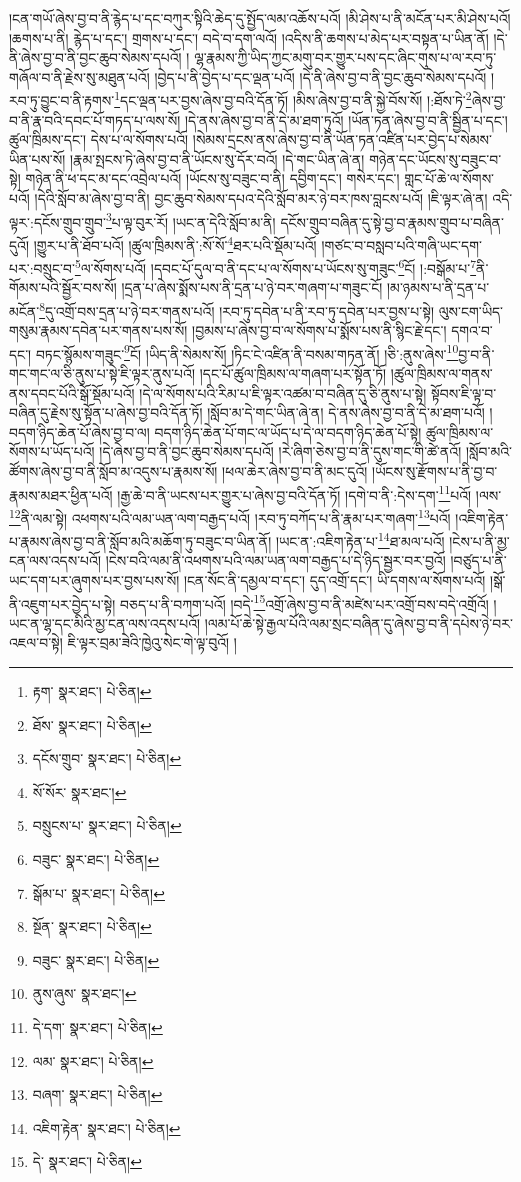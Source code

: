 །ངན་གཡོ་ཞེས་བྱ་བ་ནི་རྙེད་པ་དང་བཀུར་སྟིའི་ཆེད་དུ་སྤྱོད་ལམ་འཆོས་པའོ། །མི་ཤེས་པ་ནི་མངོན་པར་མི་ཤེས་པའོ། །ཆགས་པ་ནི། རྙེད་པ་དང་། གྲགས་པ་དང་། བདེ་བ་དག་ལའོ། །འདིས་ནི་ཆགས་པ་མེད་པར་བསྟན་པ་ཡིན་ནོ། །དེ་ནི་ཞེས་བྱ་བ་ནི་བྱང་ཆུབ་སེམས་དཔའོ། །
ལྷ་རྣམས་ཀྱི་ཡིད་ཀྱང་མགུ་བར་གྱུར་པས་དང་ཞིང་གུས་པ་ལ་རབ་ཏུ་གཞོལ་བ་ནི་རྗེས་སུ་མཐུན་པའོ། །བྱེད་པ་ནི་བྱེད་པ་དང་ལྡན་པའོ། །དེ་ནི་ཞེས་བྱ་བ་ནི་བྱང་ཆུབ་སེམས་དཔའོ། །རབ་ཏུ་བྱུང་བ་ནི་རྟགས་\footnote{རྟག་  སྣར་ཐང་།  པེ་ཅིན། }དང་ལྡན་པར་བྱས་ཞེས་བྱ་བའི་དོན་ཏོ། །མིས་ཞེས་བྱ་བ་ནི་སྐྱེ་བོས་སོ། །:ཐོས་ཏེ་\footnote{ཐོས་  སྣར་ཐང་།  པེ་ཅིན། }ཞེས་བྱ་བ་ནི་རྣ་བའི་དབང་པོ་གཏད་པ་ལས་སོ། །དེ་ནས་ཞེས་བྱ་བ་ནི་དེ་མ་ཐག་ཏུའོ། །ཡོན་ཏན་ཞེས་བྱ་བ་ནི་སྦྱིན་པ་དང་། ཚུལ་ཁྲིམས་དང་། དེས་པ་ལ་སོགས་པའོ། །སེམས་དྲངས་ནས་ཞེས་བྱ་བ་ནི་ཡོན་ཏན་འཛིན་པར་བྱེད་པ་སེམས་ཡིན་པས་སོ། །རྣམ་སྤངས་ཏེ་ཞེས་བྱ་བ་ནི་ཡོངས་སུ་དོར་བའོ། །དེ་གང་ཡིན་ཞེ་ན། གཉེན་དང་ཡོངས་སུ་བཟུང་བ་སྟེ། གཉེན་ནི་ཕ་དང་མ་དང་འབྲེལ་པའོ། །ཡོངས་སུ་བཟུང་བ་ནི། དབྱིག་དང་། གསེར་དང་། གླང་པོ་ཆེ་ལ་སོགས་པའོ། །དེའི་སློབ་མ་ཞེས་བྱ་བ་ནི། བྱང་ཆུབ་སེམས་དཔའ་དེའི་སློབ་མར་ཉེ་བར་ཁས་བླངས་པའོ། །ཇི་ལྟར་ཞེ་ན། འདི་ལྟར་:དངོས་གྲུབ་གྲུབ་\footnote{དངོས་གྲུབ་  སྣར་ཐང་།  པེ་ཅིན། }པ་ལྟ་བུར་རོ། །ཡང་ན་དེའི་སློབ་མ་ནི། དངོས་གྲུབ་བཞིན་དུ་སྟེ་བྱ་བ་རྣམས་གྲུབ་པ་བཞིན་དུའོ། །གྱུར་པ་ནི་ཐོབ་པའོ། །ཚུལ་ཁྲིམས་ནི་:སོ་སོ་\footnote{སོ་སོར་  སྣར་ཐང་། }ཐར་པའི་སྡོམ་པའོ། །གཙང་བ་བསླབ་པའི་གཞི་ཡང་དག་པར་:བསྲུང་བ་\footnote{བསྲུངས་པ་  སྣར་ཐང་།  པེ་ཅིན། }ལ་སོགས་པའོ། །དབང་པོ་དུལ་བ་ནི་དང་པ་ལ་སོགས་པ་ཡོངས་སུ་གཟུང་\footnote{བཟུང་  སྣར་ཐང་།  པེ་ཅིན། }ངོ། །:བསྒོམ་པ་\footnote{སྒོམ་པ་  སྣར་ཐང་།  པེ་ཅིན། }ནི་གོམས་པའི་སྦྱོར་བས་སོ། །དྲན་པ་ཞེས་སྨོས་པས་ནི་དྲན་པ་ཉེ་བར་གཞག་པ་གཟུང་ངོ། །མ་ཉམས་པ་ནི་དྲན་པ་མངོན་\footnote{སྔོན་  སྣར་ཐང་།  པེ་ཅིན། }དུ་འགྲོ་བས་དྲན་པ་ཉེ་བར་གནས་པའོ། །རབ་ཏུ་དབེན་པ་ནི་རབ་ཏུ་དབེན་པར་བྱས་པ་སྟེ། ལུས་ངག་ཡིད་གསུམ་རྣམས་དབེན་པར་གནས་པས་སོ། །བྱམས་པ་ཞེས་བྱ་བ་ལ་སོགས་པ་སྨོས་པས་ནི་སྙིང་རྗེ་དང་། དགའ་བ་དང་། བཏང་སྙོམས་གཟུང་\footnote{བཟུང་  སྣར་ཐང་།  པེ་ཅིན། }ངོ། །ཡིད་ནི་སེམས་སོ། །ཏིང་ངེ་འཛིན་ནི་བསམ་གཏན་ནོ། །ཅི་:ནུས་ཞེས་\footnote{ནུས་ཞུས་  སྣར་ཐང་། }བྱ་བ་ནི་གང་གང་ལ་ཅི་ནུས་པ་སྟེ་ཇི་ལྟར་ནུས་པའོ། །དང་པོ་ཚུལ་ཁྲིམས་ལ་གཞག་པར་སྟོན་ཏོ། །ཚུལ་ཁྲིམས་ལ་གནས་ནས་དབང་པོའི་སྒོ་སྡོམ་པའོ། །དེ་ལ་སོགས་པའི་རིམ་པ་ཇི་ལྟར་འཚམ་བ་བཞིན་དུ་ཅི་ནུས་པ་སྟེ། སྟོབས་ཇི་ལྟ་བ་བཞིན་དུ་རྗེས་སུ་སྟོན་པ་ཞེས་བྱ་བའི་དོན་ཏོ། །སློབ་མ་དེ་གང་ཡིན་ཞེ་ན། དེ་ནས་ཞེས་བྱ་བ་ནི་དེ་མ་ཐག་པའོ། །བདག་ཉིད་ཆེན་པོ་ཞེས་བྱ་བ་ལ། བདག་ཉིད་ཆེན་པོ་གང་ལ་ཡོད་པ་དེ་ལ་བདག་ཉིད་ཆེན་པོ་སྟེ། ཚུལ་ཁྲིམས་ལ་སོགས་པ་ཡོད་པའོ། །དེ་ཞེས་བྱ་བ་ནི་བྱང་ཆུབ་སེམས་དཔའོ། །རེ་ཞིག་ཅེས་བྱ་བ་ནི་དུས་གང་གི་ཚེ་ནའོ། །སློབ་མའི་ཚོགས་ཞེས་བྱ་བ་ནི་སློབ་མ་འདུས་པ་རྣམས་སོ། །ཕལ་ཆེར་ཞེས་བྱ་བ་ནི་མང་དུའོ། །ཡོངས་སུ་རྫོགས་པ་ནི་བྱ་བ་རྣམས་མཐར་ཕྱིན་པའོ། །རྒྱ་ཆེ་བ་ནི་ཡངས་པར་གྱུར་པ་ཞེས་བྱ་བའི་དོན་ཏོ། །དགེ་བ་ནི་:དེས་དག་\footnote{དེ་དག་  སྣར་ཐང་།  པེ་ཅིན། }པའོ། །ལས་\footnote{ལམ་  སྣར་ཐང་།  པེ་ཅིན། }ནི་ལམ་སྟེ། འཕགས་པའི་ལམ་ཡན་ལག་བརྒྱད་པའོ། །རབ་ཏུ་བཀོད་པ་ནི་རྣམ་པར་གཞག་\footnote{བཞག་  སྣར་ཐང་།  པེ་ཅིན། }པའོ། །འཇིག་རྟེན་པ་རྣམས་ཞེས་བྱ་བ་ནི་སློབ་མའི་མཆོག་ཏུ་བཟུང་བ་ཡིན་ནོ། །ཡང་ན་:འཇིག་རྟེན་པ་\footnote{འཇིག་རྟེན་  སྣར་ཐང་།  པེ་ཅིན། }ཐ་མལ་པའོ། །ངེས་པ་ནི་མྱ་ངན་ལས་འདས་པའོ། །ངེས་བའི་ལམ་ནི་འཕགས་པའི་ལམ་ཡན་ལག་བརྒྱད་པ་དེ་ཉིད་སྦྱར་བར་བྱའོ། །བཙུད་པ་ནི་ཡང་དག་པར་ཞུགས་པར་བྱས་པས་སོ། །ངན་སོང་ནི་དམྱལ་བ་དང་། དུད་འགྲོ་དང་། ཡི་དགས་ལ་སོགས་པའོ། །སྒོ་ནི་འཇུག་པར་བྱེད་པ་སྟེ། བཅད་པ་ནི་བཀག་པའོ། །བདེ་\footnote{དེ་  སྣར་ཐང་།  པེ་ཅིན། }འགྲོ་ཞེས་བྱ་བ་ནི་མཛེས་པར་འགྲོ་བས་བདེ་འགྲོའོ། །ཡང་ན་ལྷ་དང་མིའི་མྱ་ངན་ལས་འདས་པའོ། །ལམ་པོ་ཆེ་སྟེ་རྒྱལ་པོའི་ལམ་སྲང་བཞིན་དུ་ཞེས་བྱ་བ་ནི་དཔེས་ཉེ་བར་འཇལ་བ་སྟེ། ཇི་ལྟར་བྲམ་ཟེའི་ཁྱེའུ་སེང་གེ་ལྟ་བུའོ། །
